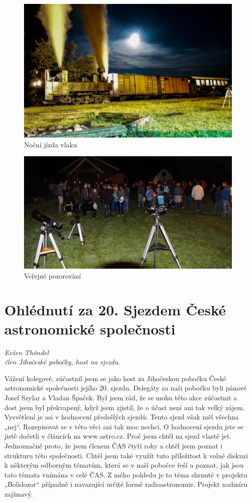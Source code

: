 \documentclass[10pt,a5paper,twoside]{book}
\newcommand{\nadpis}[2]{
\section*{#1}
	\begin{flushright}
	\textit{#2}
	\end{flushright}
}
\begin{document}
\begin{figure}[ht!]
\centering
\includegraphics[width=\textwidth]{media/astrovlak/st.jpg}
\caption{Noční jízda vlaku}
\end{figure}
\vfill
\begin{figure}[ht!]
\centering
\includegraphics[width=\textwidth]{media/astrovlak/pozorovani.jpg}
\caption{Veřejné pozorování}
\end{figure}
\newpage
\nadpis{Ohlédnutí za 20. Sjezdem České astronomické společnosti}{Evžen Thöndel \\ člen Jihočeské pobočky, host na sjezdu.}

Vážení kolegové,
zúčastnil jsem se jako host za Jihočeskou pobočku České astronomické společnosti jejího 20. sjezdu. Delegáty za naši pobočku byli pánové Josef Szylar a Vladan Špaček. Byl jsem rád, že se mohu této akce zúčastnit a dost jsem byl překvapený, když jsem zjistil, že o účast není ani tak velký zájem. Vysvětlení je asi v hodnocení předešlých sjezdů. Tento sjezd však měl všechna „nej“. Rozepisovat se v této věci ani tak moc nechci. O hodnocení sjezdu jste se jistě dočetli v článcích na www.astro.cz. Proč jsem chtěl na sjezd vlastě jet. Jednoznačně proto, že jsem členem ČAS čtyři roky a chtěl jsem poznat i strukturu této společnosti. Chtěl jsem také využít tuto příležitost k volné diskuzi k některým odborným tématům, která se v naší pobočce řeší a poznat, jak jsou tato témata vnímána v celé ČAS. Z mého pohledu je to téma shrnuté v projektu „Bolidozor“ případně i navazující určité formě radioastronomie. Projekt nadmíru zajímavý.
\end{document}
